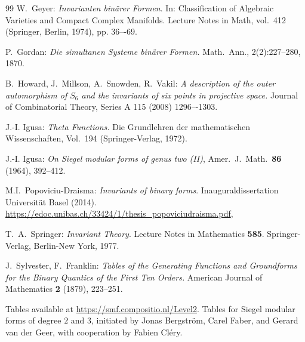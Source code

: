 \documentclass[12pt]{amsart}
\numberwithin{equation}{section}
\numberwithin{equation}{section}
\theoremstyle{definition}
\theoremstyle{remark}
\begin{document}
\begin{thebibliography}{99}
W.\ Geyer: {\sl Invarianten bin\"arer Formen}.  In: Classification of Algebraic Varieties and Compact
Complex Manifolds. Lecture Notes in Math, vol.\ 412 (Springer, Berlin, 1974), pp. 36–-69.

P.\ Gordan: {\sl Die simultanen Systeme bin\"arer Formen.} Math.\ Ann., 2(2):227--280, 1870.


 B.\ Howard, J.\ Millson, A.\ Snowden, R.\ Vakil:
{\sl A description of the outer automorphism of $S_6$ and the invariants of six points in projective space.}
Journal of Combinatorial Theory, Series A 115 (2008) 1296–-1303.


 J.-I. Igusa: {\sl Theta Functions.} 
Die Grundlehren der mathematischen Wissenschaften,
Vol.\ 194 (Springer-Verlag, 1972).

J.-I. Igusa:
{\sl On Siegel modular forms of genus two (II)},
Amer.\ J.\ Math.\ \textbf{86} (1964), 392--412.

 M.I.\ Popoviciu-Draisma:
{\sl Invariants of binary forms}. Inauguraldissertation Universit\"at Basel (2014).
{\url{https://edoc.unibas.ch/33424/1/thesis_popoviciudraisma.pdf}},

 T.\ A.\ Springer: {\sl Invariant Theory}. 
Lecture Notes in Mathematics \textbf{585}. Springer-Verlag, Berlin-New York, 1977.

 J.\ Sylvester, F.\ Franklin:
{\sl Tables of the {G}enerating {F}unctions and {G}roundforms for
              the {B}inary {Q}uantics of the {F}irst {T}en {O}rders.}
American Journal of Mathematics \textbf{2} (1879), 223--251.

Tables available at {\url{https://smf.compositio.nl/Level2}}.
Tables for Siegel modular forms of degree $2$ and $3$,
initiated by Jonas Bergstr\"om, Carel Faber, and Gerard van der Geer, with
cooperation by Fabien Cl\'ery.




\end{thebibliography}

\end{document}
